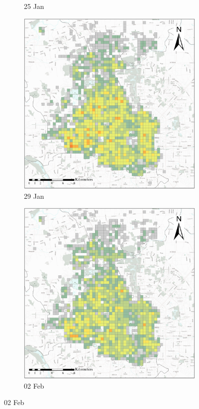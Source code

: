 \documentclass[preprints,article,accept,moreauthors,pdftex]{Definitions/mdpi}
\begin{document}
\begin{figure}[ht]
\begin{subfigure}{.23\textwidth}
        \caption{25 Jan}
    \end{subfigure}
    \begin{subfigure}{.23\textwidth}
        \includegraphics[width=\textwidth]{Figures/Overall_spatial_patterns/FN5_D2020_01_29.eps}
        \caption{29 Jan}
    \end{subfigure}
        \begin{subfigure}{.23\textwidth}
        \includegraphics[width=\textwidth]{Figures/Overall_spatial_patterns/FN5_D2020_02_02.eps}
        \caption{02 Feb}
    \end{subfigure}
    

\end{figure}
\end{document}
